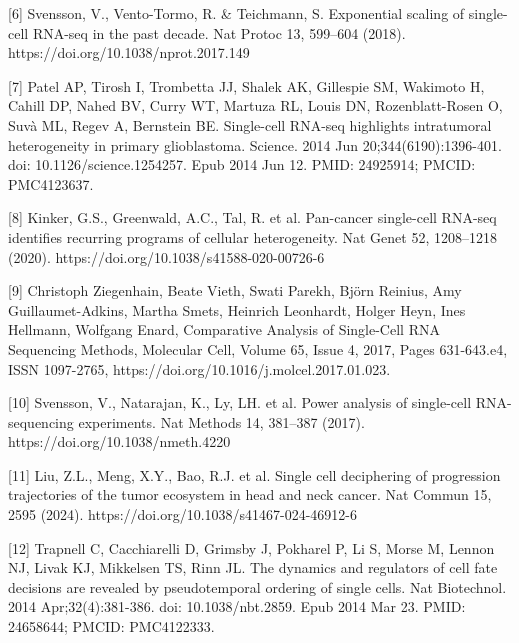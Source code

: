 \documentclass{article}
\begin{document}
[6] Svensson, V., Vento-Tormo, R. \& Teichmann, S. Exponential scaling of single-cell RNA-seq in the past decade. Nat Protoc 13, 599–604 (2018). https://doi.org/10.1038/nprot.2017.149

[7] Patel AP, Tirosh I, Trombetta JJ, Shalek AK, Gillespie SM, Wakimoto H, Cahill DP, Nahed BV, Curry WT, Martuza RL, Louis DN, Rozenblatt-Rosen O, Suvà ML, Regev A, Bernstein BE. Single-cell RNA-seq highlights intratumoral heterogeneity in primary glioblastoma. Science. 2014 Jun 20;344(6190):1396-401. doi: 10.1126/science.1254257. Epub 2014 Jun 12. PMID: 24925914; PMCID: PMC4123637.

[8] Kinker, G.S., Greenwald, A.C., Tal, R. et al. Pan-cancer single-cell RNA-seq identifies recurring programs of cellular heterogeneity. Nat Genet 52, 1208–1218 (2020). https://doi.org/10.1038/s41588-020-00726-6

[9] Christoph Ziegenhain, Beate Vieth, Swati Parekh, Björn Reinius, Amy Guillaumet-Adkins, Martha Smets, Heinrich Leonhardt, Holger Heyn, Ines Hellmann, Wolfgang Enard, Comparative Analysis of Single-Cell RNA Sequencing Methods, Molecular Cell, Volume 65, Issue 4, 2017, Pages 631-643.e4, ISSN 1097-2765, https://doi.org/10.1016/j.molcel.2017.01.023.

[10] Svensson, V., Natarajan, K., Ly, LH. et al. Power analysis of single-cell RNA-sequencing experiments. Nat Methods 14, 381–387 (2017). https://doi.org/10.1038/nmeth.4220

[11] Liu, Z.L., Meng, X.Y., Bao, R.J. et al. Single cell deciphering of progression trajectories of the tumor ecosystem in head and neck cancer. Nat Commun 15, 2595 (2024). https://doi.org/10.1038/s41467-024-46912-6

[12] Trapnell C, Cacchiarelli D, Grimsby J, Pokharel P, Li S, Morse M, Lennon NJ, Livak KJ, Mikkelsen TS, Rinn JL. The dynamics and regulators of cell fate decisions are revealed by pseudotemporal ordering of single cells. Nat Biotechnol. 2014 Apr;32(4):381-386. doi: 10.1038/nbt.2859. Epub 2014 Mar 23. PMID: 24658644; PMCID: PMC4122333.
\end{document}

